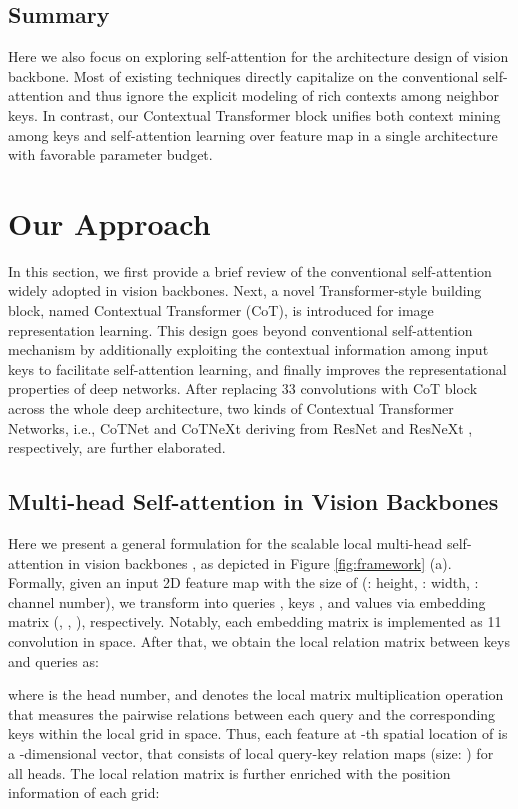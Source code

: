 \documentclass[10pt,twocolumn,letterpaper]{article}
\begin{document}
\subsection{Summary} Here we also focus on exploring self-attention for the architecture design of vision backbone. Most of existing techniques directly capitalize on the conventional self-attention and thus ignore the explicit modeling of rich contexts among neighbor keys. In contrast, our Contextual Transformer block unifies both context mining among keys and self-attention learning over feature map in a single architecture with favorable parameter budget.



\section{Our Approach}

In this section, we first provide a brief review of the conventional self-attention widely adopted in vision backbones. Next, a novel Transformer-style building block, named Contextual Transformer (CoT), is introduced for image representation learning. This design goes beyond conventional self-attention mechanism by additionally exploiting the contextual information among input keys to facilitate self-attention learning, and finally improves the representational properties of deep networks. After replacing 33 convolutions with CoT block across the whole deep architecture, two kinds of Contextual Transformer Networks, i.e., CoTNet and CoTNeXt deriving from ResNet \cite{he2016deep} and ResNeXt \cite{xie2017aggregated}, respectively, are further elaborated.


\subsection{Multi-head Self-attention in Vision Backbones}

Here we present a general formulation for the scalable local multi-head self-attention in vision backbones \cite{hu2019local,ramachandran2019stand,zhao2020exploring}, as depicted in Figure \ref{fig:framework} (a). Formally, given an input 2D feature map  with the size of  (: height, : width, : channel number), we transform  into queries , keys , and values  via embedding matrix (, , ), respectively. Notably, each embedding matrix is implemented as 11 convolution in space. After that, we obtain the local relation matrix  between keys  and queries  as:

where  is the head number, and  denotes the local matrix multiplication operation that measures the pairwise relations between each query and the corresponding keys within the local  grid in space. Thus, each feature  at -th spatial location of  is a -dimensional vector, that consists of  local query-key relation maps (size: ) for all heads. The local relation matrix  is further enriched with the position information of each  grid:
\end{document}
